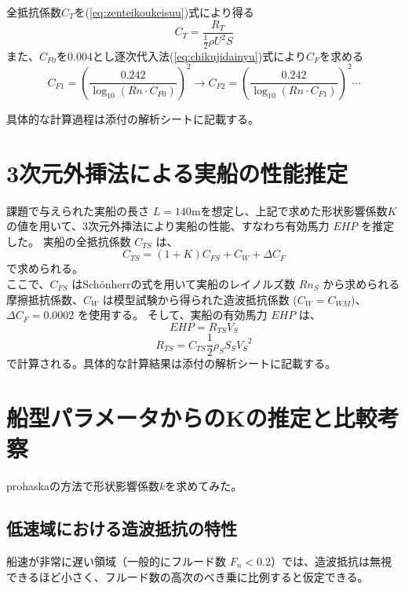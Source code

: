 \documentclass[dvipdfmx,a4paper]{jreport} %
\begin{document}
全抵抗係数$C_T$を(\ref{eq:zenteikoukeisuu})式により得る
\begin{equation}
    \label{eq:zenteikoukeisuu}
    C_T=\frac{R_T}{\frac{1}{2}\rho U^2S}
\end{equation}
また、$C_{F0}$を$0.004$とし逐次代入法(\ref{eq:chikujidainyu})式により$C_F$を求める
\begin{equation}
    C_{F1} = \left( \frac{0.242}{\log_{10}(Rn \cdot C_{F0})} \right)^2 \rightarrow C_{F2} = \left( \frac{0.242}{\log_{10}(Rn \cdot C_{F1})} \right)^2 \cdots
    \label{eq:chikujidainyu}
\end{equation}

具体的な計算過程は添付の解析シートに記載する。

\section{3次元外挿法による実船の性能推定}
課題で与えられた実船の長さ $L=140 \text{m}$を想定し、上記で求めた形状影響係数$K$の値を用いて、3次元外挿法により実船の性能、すなわち有効馬力 $EHP$ を推定した。
実船の全抵抗係数 $C_{TS}$ は、
\begin{equation}
    \label{3jigengaisoho}
    C_{TS}=(1+K)C_{FS}+C_{W}+\Delta C_{F}   
\end{equation}
で求められる。\\
    ここで、$C_{FS}$ はSchönherrの式を用いて実船のレイノルズ数 $Rn_S$ から求められる摩擦抵抗係数、$C_W$ は模型試験から得られた造波抵抗係数 ($C_W = C_{WM}$)、$\Delta C_F = 0.0002$ を使用する。
そして、実船の有効馬力 $EHP$ は、
$$EHP=R_{TS}V_{S}$$
$$R_{TS}=C_{TS}\frac{1}{2}\rho_{S}S_{S}{V_{S}}^{2}$$
で計算される。具体的な計算結果は添付の解析シートに記載する。

\section{船型パラメータからのKの推定と比較考察}
prohaskaの方法で形状影響係数$k$を求めてみた。

\subsection{低速域における造波抵抗の特性}
船速が非常に遅い領域（一般的にフルード数 $F_n < 0.2$）では、造波抵抗は無視できるほど小さく、フルード数の高次のべき乗に比例すると仮定できる。
\end{document}
